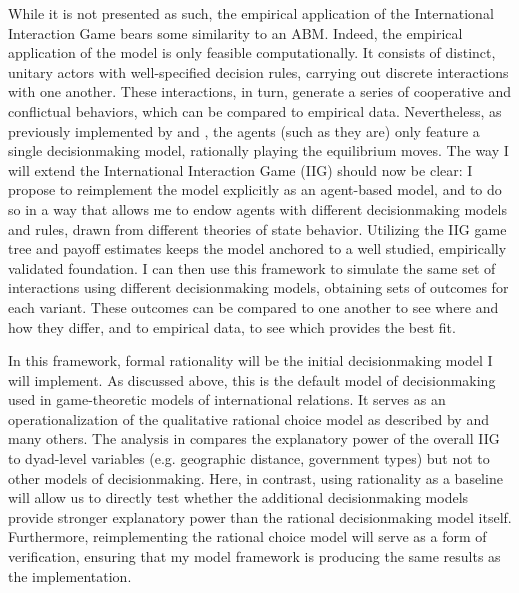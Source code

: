 While it is not presented as such, the \citet{bdm_1992} empirical application of the International Interaction Game bears some similarity to an ABM. Indeed, the empirical application of the model is only feasible computationally. It consists of distinct, unitary actors with well-specified decision rules, carrying out discrete interactions with one another. These interactions, in turn, generate a series of cooperative and conflictual behaviors, which can be compared to empirical data. Nevertheless, as previously implemented by \citet{bdm_1992} and \citet{bennett_2000,bennett_2000b}, the agents (such as they are) only feature a single decisionmaking model, rationally playing the equilibrium moves. The way I will extend the International Interaction Game (IIG) should now be clear: I propose to reimplement the model explicitly as an agent-based model, and to do so in a way that allows me to endow agents with  different decisionmaking models and rules, drawn from different theories of state behavior. Utilizing the IIG game tree and payoff estimates keeps the model anchored to a well studied, empirically validated foundation. I can then use this framework to simulate the same set of interactions using different decisionmaking models, obtaining sets of outcomes for each variant. These outcomes can be compared to one another to see where and how they differ, and to empirical data, to see which provides the best fit.


In this framework, formal rationality will be the initial decisionmaking model I will implement. As discussed above, this is the default model of decisionmaking used in game-theoretic models of international relations. It serves as an operationalization of the qualitative rational choice model as described by \citet{allison_1999} and many others. The analysis in \citet{bennett_2000} compares the explanatory power of the overall IIG to dyad-level variables (e.g. geographic distance, government types) but not to other models of decisionmaking. Here, in contrast, using rationality as a baseline will allow us to directly test whether the additional decisionmaking models provide stronger explanatory power than the rational decisionmaking model itself. Furthermore, reimplementing the rational choice model will serve as a form of verification, ensuring that my model framework is producing the same results as the \citet{bennett_2000,bennett_2000b} implementation.

